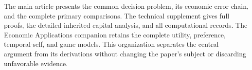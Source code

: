 The main article presents the common decision problem, its economic error
chain, and the complete primary comparisons. The technical supplement gives
full proofs, the detailed inherited capital analysis, and all computational
records. The Economic Applications companion retains the complete utility,
preference, temporal-self, and game models. This organization separates the
central argument from its derivations without changing the paper's subject
or discarding unfavorable evidence.
